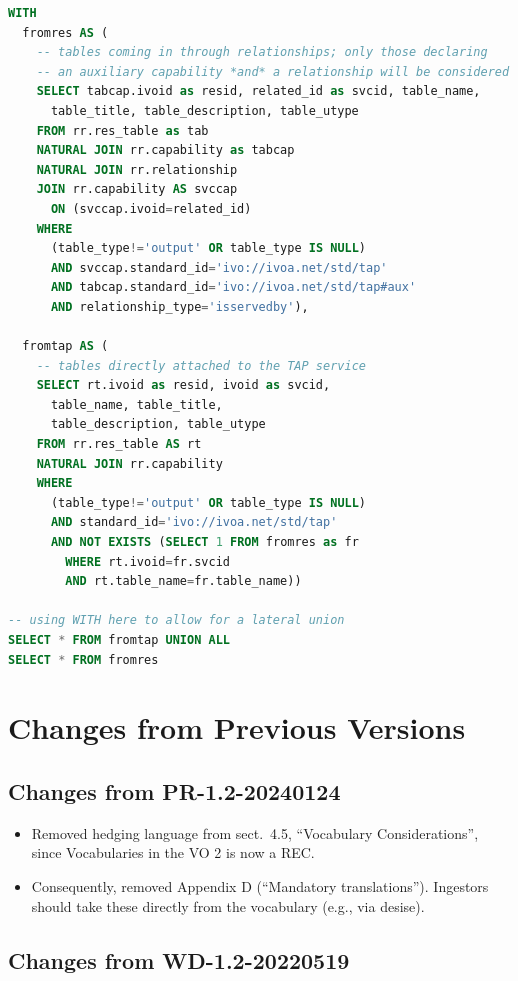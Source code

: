 \documentclass[11pt,a4paper]{ivoa}
\begin{document}
\begin{lstlisting}[basicstyle=\footnotesize,language=SQL]
WITH
  fromres AS (
    -- tables coming in through relationships; only those declaring
    -- an auxiliary capability *and* a relationship will be considered
    SELECT tabcap.ivoid as resid, related_id as svcid, table_name,
      table_title, table_description, table_utype
    FROM rr.res_table as tab
    NATURAL JOIN rr.capability as tabcap
    NATURAL JOIN rr.relationship
    JOIN rr.capability AS svccap
      ON (svccap.ivoid=related_id)
    WHERE
      (table_type!='output' OR table_type IS NULL)
      AND svccap.standard_id='ivo://ivoa.net/std/tap'
      AND tabcap.standard_id='ivo://ivoa.net/std/tap#aux'
      AND relationship_type='isservedby'),

  fromtap AS (
    -- tables directly attached to the TAP service
    SELECT rt.ivoid as resid, ivoid as svcid,
      table_name, table_title,
      table_description, table_utype
    FROM rr.res_table AS rt
    NATURAL JOIN rr.capability
    WHERE
      (table_type!='output' OR table_type IS NULL)
      AND standard_id='ivo://ivoa.net/std/tap'
      AND NOT EXISTS (SELECT 1 FROM fromres as fr
        WHERE rt.ivoid=fr.svcid
        AND rt.table_name=fr.table_name))

-- using WITH here to allow for a lateral union
SELECT * FROM fromtap UNION ALL
SELECT * FROM fromres
\end{lstlisting}


\section{Changes from Previous Versions}

\subsection{Changes from PR-1.2-20240124}

\begin{itemize}
\item Removed hedging language from sect.~4.5, ``Vocabulary
Considerations'', since Vocabularies in the VO 2 is now a REC.

\item Consequently, removed Appendix D (``Mandatory translations'').
Ingestors should take these directly from the vocabulary (e.g., via
desise).

\end{itemize}

\subsection{Changes from WD-1.2-20220519}
\end{document}
